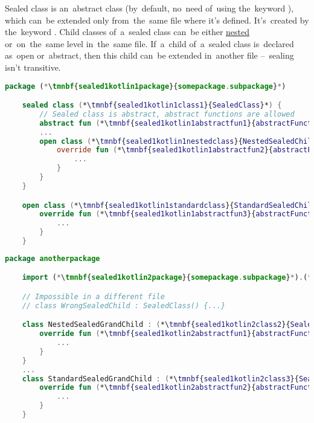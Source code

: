 \label{kotlinsealedclass}
Sealed class is an~abstract class (by~default, no~need of~using the~keyword ), which can~be extended only from~the~same file where it's defined.
It's~created by the~keyword .
Child classes of~a~sealed class can~be either \hyperref[kotlininnerclass]{nested} or~on~the~same level in~the~same file.
If~a~child of~a~sealed class is~declared as~open or~abstract, then this child can~be extended in~another file --~sealing isn't transitive.

\emtwen
\example
\begin{lstlisting}[language=Kotlin, title={File with a~sealed class}]
    package (*\tmnbf{sealed1kotlin1package}{somepackage.subpackage}*)

    sealed class (*\tmnbf{sealed1kotlin1class1}{SealedClass}*) {
        // Sealed class is abstract, abstract functions are allowed
        abstract fun (*\tmnbf{sealed1kotlin1abstractfun1}{abstractFunction}*)()
        ...
        open class (*\tmnbf{sealed1kotlin1nestedclass}{NestedSealedChild}*) : (*\tmnbf{sealed1kotlin1class2}{SealedClass}*)() {
            override fun (*\tmnbf{sealed1kotlin1abstractfun2}{abstractFunction}*)() {
                ...
            }
        }
    }

    open class (*\tmnbf{sealed1kotlin1standardclass}{StandardSealedChild}*) : (*\tmnbf{sealed1kotlin1class3}{SealedClass}*)() {
        override fun (*\tmnbf{sealed1kotlin1abstractfun3}{abstractFunction}*)() {
            ...
        }
    }
\end{lstlisting}
\begin{lstlisting}[language=Kotlin, title={Another file with extensions of~children of~the~sealed class}]
    package anotherpackage

    import (*\tmnbf{sealed1kotlin2package}{somepackage.subpackage}*).(*\tmnbf{sealed1kotlin2class1}{SealedClass}*)

    // Impossible in a different file
    // class WrongSealedChild : SealedClass() {...}

    class NestedSealedGrandChild : (*\tmnbf{sealed1kotlin2class2}{SealedClass}*).(*\tmnbf{sealed1kotlin2nestedclass}{NestedSealedChild}*)() {
        override fun (*\tmnbf{sealed1kotlin2abstractfun1}{abstractFunction}*)() {
            ...
        }
    }
    ...
    class StandardSealedGrandChild : (*\tmnbf{sealed1kotlin2class3}{SealedClass}*).(*\tmnbf{sealed1kotlin2standardclass}{StandardSealedChild}*)() {
        override fun (*\tmnbf{sealed1kotlin2abstractfun2}{abstractFunction}*)() {
            ...
        }
    }
\end{lstlisting}
